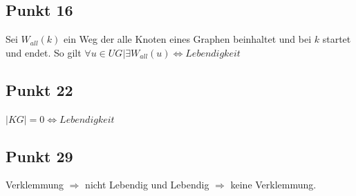 \documentclass[10pt]{scrartcl}
\begin{document}
		\subsection{Punkt 16}
		Sei $W_{all}(k)$ ein Weg der alle Knoten eines Graphen beinhaltet und bei $k$ startet und endet.
		So gilt $\forall u \in UG | \exists  W_{all}(u) \Longleftrightarrow \textit{Lebendigkeit}$		
		
		\subsection{Punkt 22}
		$|KG| = 0 \Longleftrightarrow Lebendigkeit$	
		
		\subsection{Punkt 29}
		Verklemmung $\Longrightarrow$ nicht Lebendig und Lebendig $\Longrightarrow$ keine Verklemmung.
		
\end{document}
